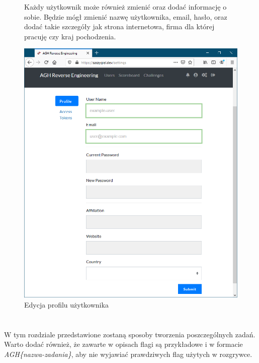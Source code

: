 \documentclass[polish,12pt]{aghthesis}
\begin{document}
\begin{figure}[ht]
    Każdy użytkownik może również zmienić oraz dodać informację o sobie.
    Będzie mógł zmienić nazwę użytkownika, email, hasło, oraz dodać
    takie szczegóły jak strona internetowa, firma dla której pracuję czy kraj pochodzenia.

    \vspace{1cm}

    \centering
    \includegraphics[width=14cm]{szczygiel_dev_settings}
    \caption{Edycja profilu użytkownika}
    \label{fig:szczygiel_dev_settings}
\end{figure}

\clearpage

\section{\SectionTitleRealizationAspects}
\label{sec:wybrane-aspekty-realizacji}

W tym rozdziale przedstawione zostaną sposoby tworzenia poszczególnych zadań.
Warto dodać również, że zawarte w opisach flagi są przykładowe i w formacie
\emph{AGH\{nazwa-zadania\}}, aby nie wyjawiać prawdziwych flag użytych w rozgrywce.
\end{document}
